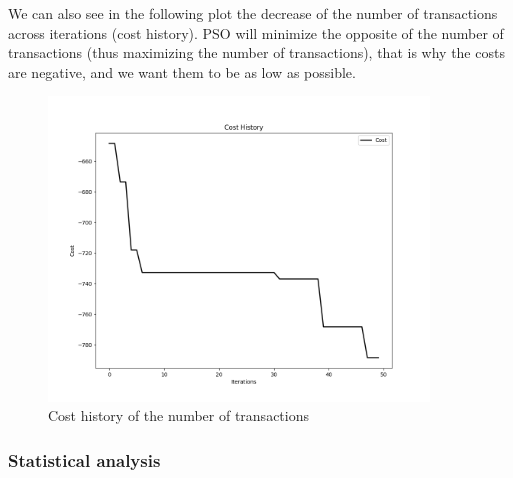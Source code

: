         We can also see in the following plot the decrease of the number of transactions across iterations (cost history). PSO will minimize the opposite of the number of transactions (thus maximizing the number of transactions), that is why the costs are negative, and we want them to be as low as possible.

        \begin{figure}[H]
            \centering
            \includegraphics[width=0.9\textwidth]{img/opti/costHistoryNbTransactions.png}
            \caption{Cost history of the number of transactions}
        \end{figure}


        \subsubsection{Statistical analysis}


